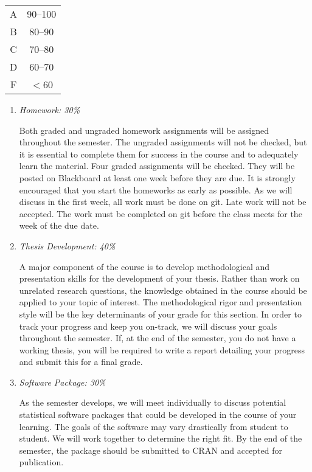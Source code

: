 \documentclass[12pt]{article}
\begin{document}
\begin{center}
\begin{tabular}{|c|c|}
\hline
A&90--100\\
B&80--90\\
C&70--80\\
D&60--70\\
F&$<$60\\
\hline
\end{tabular}
\end{center}

\begin{enumerate}[1)]


\item \emph{Homework: 30\%}

Both graded and ungraded homework assignments will be assigned throughout the semester. The ungraded assignments will not be checked, but it is essential to complete them for success in the course and to adequately learn the material. Four graded assignments will be checked. They will be posted on Blackboard at least one week before they are due. It is strongly encouraged that you start the homeworks as early as possible. As we will discuss in the first week, all work must be done on git. Late work will not be accepted. The work must be completed on git before the class meets for the week of the due date.


\item \emph{Thesis Development: 40\%}

A major component of the course is to develop methodological and presentation skills for the development of your thesis. Rather than work on unrelated research questions, the knowledge obtained in the course should be applied to your topic of interest. The methodological rigor and presentation style will be the key determinants of your grade for this section. In order to track your progress and keep you on-track, we will discuss your goals throughout the semester. If, at the end of the semester, you do not have a working thesis, you will be required to write a report detailing your progress and submit this for a final grade.

\item \emph{Software Package: 30\%}

As the semester develops, we will meet individually to discuss potential statistical software packages that could be developed in the course of your learning. The goals of the software may vary drastically from student to student. We will work together to determine the right fit. By the end of the semester, the package should be submitted to CRAN and accepted for publication.


\end{enumerate}
\end{document}
